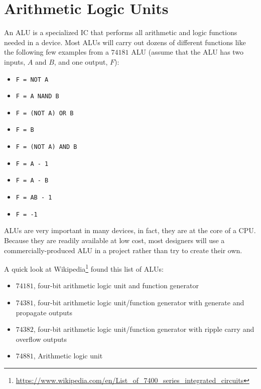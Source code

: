 \section{Arithmetic Logic Units}
\label{CL:sec:arithmetic_and_logic_units}

An \ac{ALU} is a specialized \ac{IC} that performs all arithmetic and logic functions needed in a device. Most \acp{ALU} will carry out dozens of different functions like the following few examples from a $ 74181 $ \ac{ALU} (assume that the ALU has two inputs, $ A $ and $ B $, and one output, $ F $):

\begin{itemize}
  \item \lstinline[columns=fixed]|F = NOT A|
  \item \lstinline[columns=fixed]|F = A NAND B|
  \item \lstinline[columns=fixed]|F = (NOT A) OR B|
  \item \lstinline[columns=fixed]|F = B|
  \item \lstinline[columns=fixed]|F = (NOT A) AND B|
  \item \lstinline[columns=fixed]|F = A - 1|
  \item \lstinline[columns=fixed]|F = A - B|
  \item \lstinline[columns=fixed]|F = AB - 1|
  \item \lstinline[columns=fixed]|F = -1|
\end{itemize}

\acp{ALU} are very important in many devices, in fact, they are at the core of a \ac{CPU}. Because they are readily available at low cost, most designers will use a commercially-produced \ac{ALU} in a project rather than try to create their own.

A quick look at Wikipedia\footnote{\url{https://www.wikipedia.com/en/List_of_7400_series_integrated_circuits}} found this list of \acp{ALU}:

\begin{itemize}
  \item $ 74181 $, four-bit arithmetic logic unit and function generator
  \item $ 74381 $, four-bit arithmetic logic unit/function generator with generate and propagate outputs
  \item $ 74382 $, four-bit arithmetic logic unit/function generator with ripple carry and overflow outputs
  \item $ 74881 $, Arithmetic logic unit
\end{itemize}

